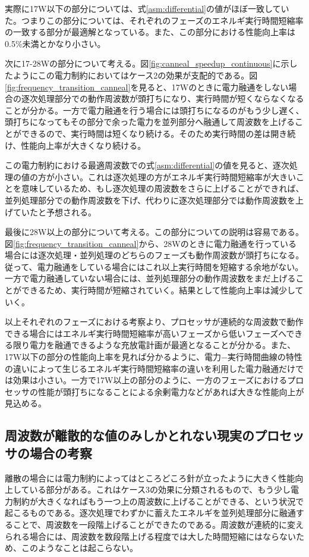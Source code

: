 実際に17W以下の部分については、式\ref{asm:differential}の値がほぼ一致していた。つまりこの部分については、それぞれのフェーズのエネルギ実行時間短縮率の一致する部分が最適解となっている。また、この部分における性能向上率は0.5\%未満とかなり小さい。

次に17-28Wの部分について考える。図\ref{fig:canneal_speedup_continuous}に示したようにこの電力制約においてはケース2の効果が支配的である。図\ref{fig:frequency_transition_canneal}を見ると、17Wのときに電力融通をしない場合の逐次処理部分での動作周波数が頭打ちになり、実行時間が短くならなくなることが分かる。一方で電力融通を行う場合には頭打ちになるのがもう少し遅く、頭打ちになってもその部分で余った電力を並列部分へ融通して周波数を上げることができるので、実行時間は短くなり続ける。そのため実行時間の差は開き続け、性能向上率が大きくなり続ける。

この電力制約における最適周波数での式\ref{asm:differential}の値を見ると、逐次処理の値の方が小さい。これは逐次処理の方がエネルギ実行時間短縮率が大きいことを意味しているため、もし逐次処理の周波数をさらに上げることができれば、並列処理部分での動作周波数を下げ、代わりに逐次処理部分では動作周波数を上げていたと予想される。

最後に28W以上の部分について考える。この部分についての説明は容易である。図\ref{fig:frequency_transition_canneal}から、28Wのときに電力融通を行っている場合には逐次処理・並列処理のどちらのフェーズも動作周波数が頭打ちになる。従って、電力融通をしている場合にはこれ以上実行時間を短縮する余地がない。一方で電力融通していない場合には、並列処理部分の動作周波数をまだ上げることができるため、実行時間が短縮されていく。結果として性能向上率は減少していく。

以上それぞれのフェーズにおける考察より、プロセッサが連続的な周波数で動作できる場合にはエネルギ実行時間短縮率が高いフェーズから低いフェーズへできる限り電力を融通できるような充放電計画が最適となることが分かる。また、17W以下の部分の性能向上率を見れば分かるように、電力−実行時間曲線の特性の違いによって生じるエネルギ実行時間短縮率の違いを利用した電力融通だけでは効果は小さい。一方で17W以上の部分のように、一方のフェーズにおけるプロセッサの性能が頭打ちになることによる余剰電力などがあれば大きな性能向上が見込める。

\subsection{周波数が離散的な値のみしかとれない現実のプロセッサの場合の考察}
\label{subsec:discrete}

離散の場合には電力制約によってはところどころ針が立ったように大きく性能向上している部分がある。これはケース3の効果に分類されるもので、もう少し電力制約が大きくなればもう一つ上の周波数に上げることができる、という状況で起こるものである。逐次処理でわずかに蓄えたエネルギを並列処理部分に融通することで、周波数を一段階上げることができたのである。周波数が連続的に変えられる場合には、周波数を数段階上げる程度では大した時間短縮にはならないため、このようなことは起こらない。

